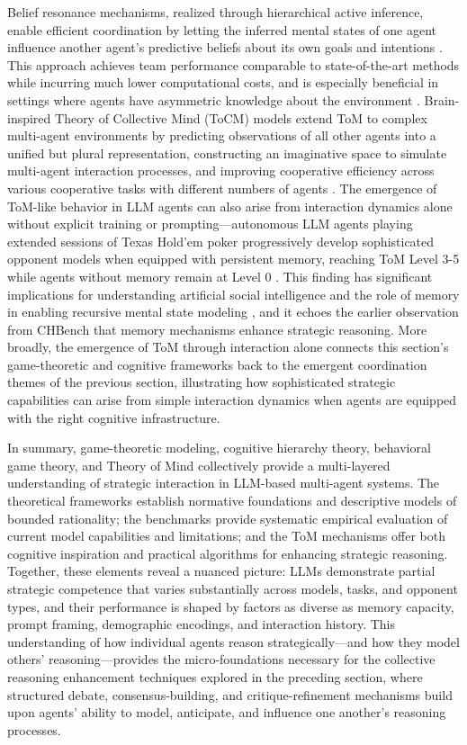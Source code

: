\documentclass[11pt]{article}
\begin{document}
Belief resonance mechanisms, realized through hierarchical active inference, enable efficient coordination by letting the inferred mental states of one agent influence another agent's predictive beliefs about its own goals and intentions \cite{ref242}. This approach achieves team performance comparable to state-of-the-art methods while incurring much lower computational costs, and is especially beneficial in settings where agents have asymmetric knowledge about the environment \cite{ref242}. Brain-inspired Theory of Collective Mind (ToCM) models extend ToM to complex multi-agent environments by predicting observations of all other agents into a unified but plural representation, constructing an imaginative space to simulate multi-agent interaction processes, and improving cooperative efficiency across various cooperative tasks with different numbers of agents \cite{ref243}. The emergence of ToM-like behavior in LLM agents can also arise from interaction dynamics alone without explicit training or prompting---autonomous LLM agents playing extended sessions of Texas Hold'em poker progressively develop sophisticated opponent models when equipped with persistent memory, reaching ToM Level 3-5 while agents without memory remain at Level 0 \cite{ref244}. This finding has significant implications for understanding artificial social intelligence and the role of memory in enabling recursive mental state modeling \cite{ref244}, and it echoes the earlier observation from CHBench that memory mechanisms enhance strategic reasoning. More broadly, the emergence of ToM through interaction alone connects this section's game-theoretic and cognitive frameworks back to the emergent coordination themes of the previous section, illustrating how sophisticated strategic capabilities can arise from simple interaction dynamics when agents are equipped with the right cognitive infrastructure.

In summary, game-theoretic modeling, cognitive hierarchy theory, behavioral game theory, and Theory of Mind collectively provide a multi-layered understanding of strategic interaction in LLM-based multi-agent systems. The theoretical frameworks establish normative foundations and descriptive models of bounded rationality; the benchmarks provide systematic empirical evaluation of current model capabilities and limitations; and the ToM mechanisms offer both cognitive inspiration and practical algorithms for enhancing strategic reasoning. Together, these elements reveal a nuanced picture: LLMs demonstrate partial strategic competence that varies substantially across models, tasks, and opponent types, and their performance is shaped by factors as diverse as memory capacity, prompt framing, demographic encodings, and interaction history. This understanding of how individual agents reason strategically---and how they model others' reasoning---provides the micro-foundations necessary for the collective reasoning enhancement techniques explored in the preceding section, where structured debate, consensus-building, and critique-refinement mechanisms build upon agents' ability to model, anticipate, and influence one another's reasoning processes.
\end{document}
